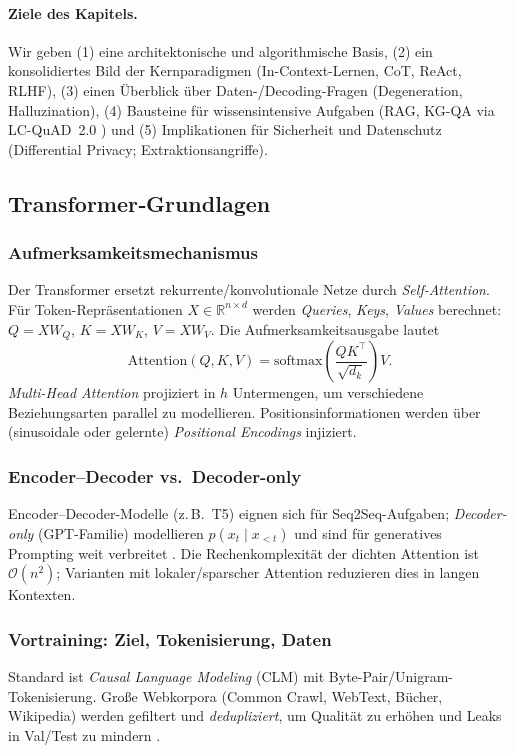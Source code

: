 \paragraph{Ziele des Kapitels.}
Wir geben (1) eine architektonische und algorithmische Basis, (2) ein konsolidiertes Bild der Kernparadigmen (In-Context-Lernen, CoT, ReAct, RLHF), (3) einen Überblick über Daten-/Decoding-Fragen (Degeneration, Halluzination), (4) Bausteine für wissensintensive Aufgaben (RAG, KG-QA via LC-QuAD~2.0 \cite{dubey2019lcquad2}) und (5) Implikationen für Sicherheit und Datenschutz (Differential Privacy; Extraktionsangriffe). 

\subsection{Transformer‐Grundlagen}
\subsubsection{Aufmerksamkeitsmechanismus}
Der Transformer \cite{vaswani2017attention} ersetzt rekurrente/konvolutionale Netze durch \emph{Self-Attention}. Für Token-Repräsentationen $X \in \mathbb{R}^{n \times d}$ werden \emph{Queries}, \emph{Keys}, \emph{Values} berechnet: $Q=XW_Q$, $K=XW_K$, $V=XW_V$. Die Aufmerksamkeitsausgabe lautet
\[
\mathrm{Attention}(Q,K,V)= \mathrm{softmax}\!\left(\frac{QK^\top}{\sqrt{d_k}}\right) V.
\]
\emph{Multi-Head Attention} projiziert in $h$ Untermengen, um verschiedene Beziehungsarten parallel zu modellieren. Positionsinformationen werden über (sinusoidale oder gelernte) \emph{Positional Encodings} injiziert. 

\subsubsection{Encoder–Decoder vs.\ Decoder-only}
Encoder–Decoder-Modelle (z.\,B.\ T5) eignen sich für Seq2Seq-Aufgaben; \emph{Decoder-only} (GPT-Familie) modellieren $p(x_t\mid x_{<t})$ und sind für generatives Prompting weit verbreitet \cite{brown2020language}. Die Rechenkomplexität der dichten Attention ist $\mathcal{O}(n^2)$; Varianten mit lokaler/sparscher Attention reduzieren dies in langen Kontexten.

\subsubsection{Vortraining: Ziel, Tokenisierung, Daten}
Standard ist \emph{Causal Language Modeling} (CLM) mit Byte-Pair/Unigram-Tokenisierung. Große Webkorpora (Common Crawl, WebText, Bücher, Wikipedia) werden gefiltert und \emph{dedupliziert}, um Qualität zu erhöhen und Leaks in Val/Test zu mindern \cite{brown2020language}. 

